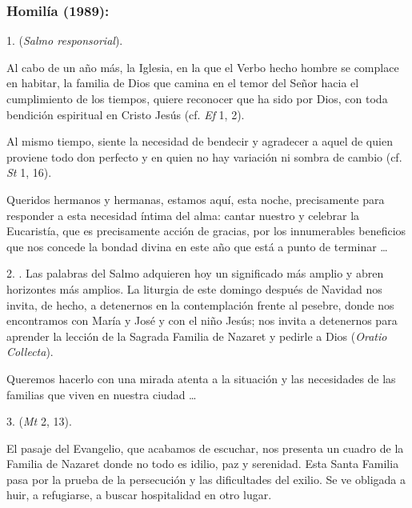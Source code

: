 			\subsubsection{Homilía (1989):} 
			

				\begin{body}
					1.  (\emph{Salmo responsorial}).
					
					Al cabo de un año más, la Iglesia,  en la que el Verbo hecho hombre se complace en habitar, la familia de Dios que camina en el temor del Señor hacia el cumplimiento de los tiempos, quiere reconocer que ha sido  por Dios, con toda bendición espiritual en Cristo Jesús (cf. \emph{Ef} 1, 2).
					
					Al mismo tiempo, siente la necesidad de bendecir y agradecer a aquel de quien proviene todo don perfecto y en quien no hay variación ni sombra de cambio (cf. \emph{St} 1, 16).
					
					Queridos hermanos y hermanas, estamos aquí, esta noche, precisamente para responder a esta necesidad íntima del alma: cantar nuestro  y celebrar la Eucaristía, que es precisamente acción de gracias, por los innumerables beneficios que nos concede la bondad divina en este año que está a punto de terminar \ldots{}
					
					2. . Las palabras del Salmo adquieren hoy un significado más amplio y abren horizontes más amplios. La liturgia de este domingo después de Navidad nos invita, de hecho, a detenernos en la contemplación frente al pesebre, donde nos encontramos con María y José y con el niño Jesús; nos invita a detenernos para aprender la lección de la Sagrada Familia de Nazaret y pedirle a Dios  (\emph{Oratio Collecta}).
					
					Queremos hacerlo con una mirada atenta a la situación y las necesidades de las familias que viven en nuestra ciudad \ldots{}
					
					3.  (\emph{Mt} 2, 13).
					
					El pasaje del Evangelio, que acabamos de escuchar, nos presenta un cuadro de la Familia de Nazaret donde no todo es idilio, paz y serenidad. Esta Santa Familia pasa por la prueba de la persecución y las dificultades del exilio. Se ve obligada a huir, a refugiarse, a buscar hospitalidad en otro lugar.
					

\end{body}
